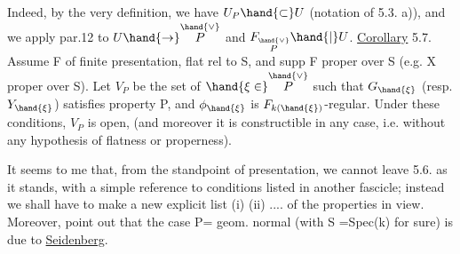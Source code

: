 Indeed, by the very definition, we have $U_P \hand{\subset} U$ (notation of 5.3. a)),
and we apply par.12 to $U \hand{\to} \overset{\hand{\vee}}{P}$ and $F_{\overset{\hand{\vee}}{P}}\hand{|}U$.
\uline{Corollary} 5.7. Assume F of finite presentation, flat rel to S,
and supp F proper over S (e.g. X proper over S). Let $V_P$ be the set of
$\hand{\xi\in}\overset{\hand{\vee}}{P}$ such that $G_{\hand{\xi}}$ (resp. $Y_{\hand{\xi}}$) satisfies property P, and $\phi_{\hand{\xi}}$ is
$F_{k(\hand{\xi})}$-regular. Under these conditions, $V_P$ is open, (and moreover it is
constructible in any case, i.e. without any hypothesis of flatness or
properness).

It seems to me that, from the standpoint of presentation, we cannot leave
5.6. as it stands, with a simple reference to conditions listed in
another fascicle; instead we shall have to make a new explicit list (i) (ii)
.... of the properties in view. Moreover, point out  that the case P= geom.
normal (with S =Spec(k) for sure) is due to \uline{Seidenberg}.


